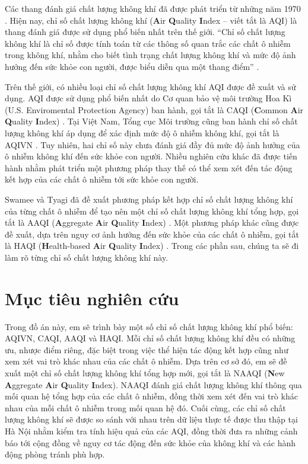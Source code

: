 \documentclass[14pt]{extreport}
\theoremstyle{definition}
\theoremstyle{plain}
\theoremstyle{remark}
\begin{document}
Các thang đánh giá chất lượng không khí đã được phát triển từ những năm 1970 \cite{Babcock1970}. Hiện nay, chỉ số chất lượng không khí (\textbf{A}ir \textbf{Q}uality \textbf{I}ndex – viết tắt là AQI) là thang đánh giá được sử dụng phổ biến nhất trên thế giới. “Chỉ số chất lượng không khí là chỉ số được tính toán từ các thông số quan trắc các chất ô nhiễm trong không khí, nhằm cho biết tình trạng chất lượng không khí và mức độ ảnh hưởng đến sức khỏe con người, được biểu diễn qua một thang điểm” \cite{TCMT2011}. 

Trên thế giới, có nhiều loại chỉ số chất lượng không khí AQI được đề xuất và sử dụng. AQI được sử dụng phổ biến nhất do Cơ quan bảo vệ môi trường Hoa Kì (U.S. Enviromental Protection Agency) ban hành, gọi tắt là CAQI (\textbf{C}ommon \textbf{A}ir \textbf{Q}uality \textbf{I}ndex) \cite{USEPA2013}. Tại Việt Nam, Tổng cục Môi trường cũng ban hành chỉ số chất lượng không khí áp dụng để xác định mức độ ô nhiễm không khí, gọi tắt là AQIVN \cite{TCMT2011}. Tuy nhiên, hai chỉ số này chưa đánh giá đầy đủ mức độ ảnh hưởng của ô nhiễm không khí đến sức khỏe con người. Nhiều nghiên cứu khác đã được tiến hành nhằm phát triển một phương pháp thay thế có thể xem xét đến tác động kết hợp của các chất ô nhiễm tới sức khỏe con người. 

Swamee và Tyagi đã đề xuất phương pháp kết hợp chỉ số chất lượng không khí của từng chất ô nhiễm để tạo nên một chỉ số chất lượng không khí tổng hợp, gọi tắt là AAQI (\textbf{A}ggregate \textbf{A}ir \textbf{Q}uality \textbf{I}ndex) \cite{Swamee1999}. Một phương pháp khác cũng được đề xuất, dựa trên nguy cơ ảnh hưởng đến sức khỏe của các chất ô nhiễm, gọi tắt là HAQI (\textbf{H}ealth-based \textbf{A}ir \textbf{Q}uality \textbf{I}ndex) \cite{Cairncross2007}. Trong các phần sau, chúng ta sẽ đi làm rõ từng chỉ số chất lượng không khí này.

\section{Mục tiêu nghiên cứu}
Trong đồ án này, em sẽ trình bày một số chỉ số chất lượng không khí phổ biến: AQIVN, CAQI, AAQI và HAQI. Mỗi chỉ số chất lượng không khí đều có những ưu, nhược điểm riêng, đặc biệt trong việc thể hiện tác động kết hợp cũng như xem xét vai trò khác nhau của các chất ô nhiễm. Dựa trên cơ sở đó, em sẽ đề xuất một chỉ số chất lượng không khí tổng hợp mới, gọi tắt là NAAQI (\textbf{N}ew \textbf{A}ggregate  \textbf{A}ir \textbf{Q}uality \textbf{I}ndex). NAAQI đánh giá chất lượng không khí thông qua mối quan hệ tổng hợp của các chất ô nhiễm, đồng thời xem xét đến vai trò khác nhau của mỗi chất ô nhiễm trong mối quan hệ đó. Cuối cùng, các chỉ số chất lượng không khí sẽ được so sánh với nhau trên dữ liệu thực tế được thu thập tại Hà Nội nhằm kiểm tra tính hiệu quả của các AQI, đồng thời đưa ra những cảnh báo tới cộng đồng về nguy cơ tác động đến sức khỏe của không khí và các hành động phòng tránh phù hợp.
\end{document}
